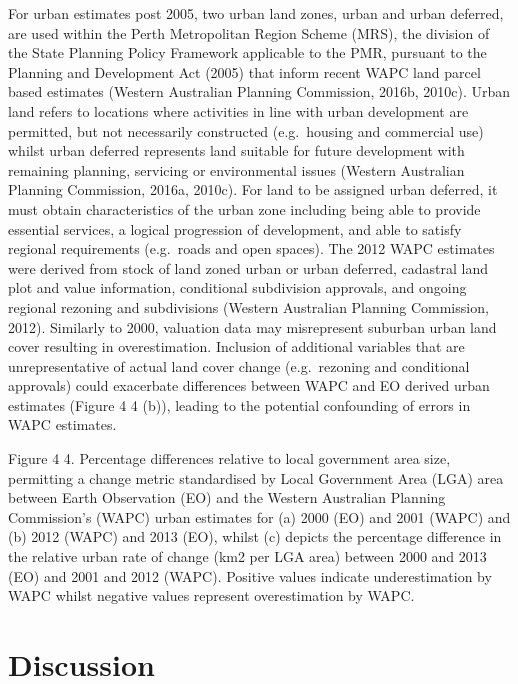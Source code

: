 \documentclass[]{book}
\begin{document}
For urban estimates post 2005, two urban land zones, urban and urban
deferred, are used within the Perth Metropolitan Region Scheme (MRS),
the division of the State Planning Policy Framework applicable to the
PMR, pursuant to the Planning and Development Act (2005) that inform
recent WAPC land parcel based estimates (Western Australian Planning
Commission, 2016b, 2010c). Urban land refers to locations where
activities in line with urban development are permitted, but not
necessarily constructed (e.g.~housing and commercial use) whilst urban
deferred represents land suitable for future development with remaining
planning, servicing or environmental issues (Western Australian Planning
Commission, 2016a, 2010c). For land to be assigned urban deferred, it
must obtain characteristics of the urban zone including being able to
provide essential services, a logical progression of development, and
able to satisfy regional requirements (e.g.~roads and open spaces). The
2012 WAPC estimates were derived from stock of land zoned urban or urban
deferred, cadastral land plot and value information, conditional
subdivision approvals, and ongoing regional rezoning and subdivisions
(Western Australian Planning Commission, 2012). Similarly to 2000,
valuation data may misrepresent suburban urban land cover resulting in
overestimation. Inclusion of additional variables that are
unrepresentative of actual land cover change (e.g.~rezoning and
conditional approvals) could exacerbate differences between WAPC and EO
derived urban estimates (Figure 4 4 (b)), leading to the potential
confounding of errors in WAPC estimates.

Figure 4 4. Percentage differences relative to local government area
size, permitting a change metric standardised by Local Government Area
(LGA) area between Earth Observation (EO) and the Western Australian
Planning Commission's (WAPC) urban estimates for (a) 2000 (EO) and 2001
(WAPC) and (b) 2012 (WAPC) and 2013 (EO), whilst (c) depicts the
percentage difference in the relative urban rate of change (km2 per LGA
area) between 2000 and 2013 (EO) and 2001 and 2012 (WAPC). Positive
values indicate underestimation by WAPC whilst negative values represent
overestimation by WAPC.

\section{Discussion}\label{discussion}
\end{document}
